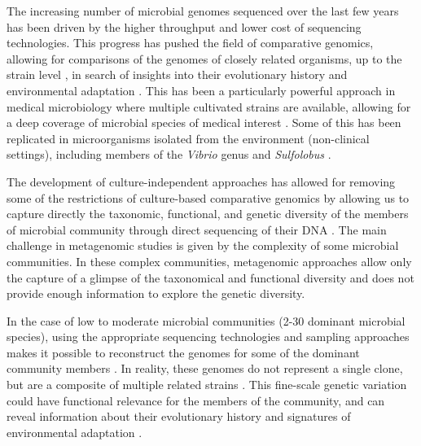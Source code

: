 The increasing number of microbial genomes sequenced over the last few years has been driven by the higher throughput and lower cost of sequencing technologies. This progress has pushed the field of comparative genomics, allowing for comparisons of the genomes of closely related organisms, up to the strain level \cite{Fricke:2011gy,Doroghazi:2013gf,Grad:2013tc,Reno:2009bq}, in search of insights into their evolutionary history and environmental adaptation \cite{Reno:2009bq,ZhuofeiXu:2011fp}. This has been a particularly powerful approach in medical microbiology where multiple cultivated strains are available, allowing for a deep coverage of microbial species of medical interest \cite{Feero:2011fr}. Some of this has been replicated in microorganisms isolated from the environment (non-clinical settings), including members of the \textit{Vibrio} genus \cite{Cordero:2012ik} and \textit{Sulfolobus} \cite{Reno:2009bq}.
 
The development of culture-independent approaches has allowed for removing some of the restrictions of culture-based comparative genomics by allowing us to capture directly the taxonomic, functional, and genetic diversity of the members of microbial community through direct sequencing of their DNA \cite{Bragg:2014kv}. The main challenge in metagenomic studies is given by the complexity of some microbial communities. In these complex communities, metagenomic approaches allow only the capture of a glimpse of the taxonomical and functional diversity and does not provide enough information to explore the genetic diversity. 

In the case of low to moderate microbial communities (2-30 dominant microbial species), using the appropriate sequencing technologies and sampling approaches makes it possible to reconstruct the genomes for some of the dominant community members \cite{Bragg:2014kv}. In reality, these genomes do not represent a single clone, but are a composite of multiple related strains \cite{Podell:2013kx,Allen:2005dg}. This fine-scale genetic variation could have functional relevance for the members of the community, and can reveal information about their evolutionary history and signatures of environmental adaptation \cite{Lo:2007ht,Hemme:2010ds,Palenik:2009kx}.

